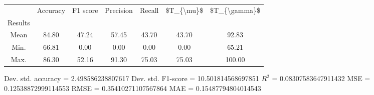 \begin{tabular}{|c|c|c|c|c|c|c|}
\toprule
{} &  Accuracy &  F1 score &  Precision &  Recall &  \$T\_\{\textbackslash mu\}\$ &  \$T\_\{\textbackslash gamma\}\$ \\
Results &           &           &            &         &            &               \\
\hline
Mean    &     84.80 &     47.24 &      57.45 &   43.70 &      43.70 &         92.83 \\
Min.    &     66.81 &      0.00 &       0.00 &    0.00 &       0.00 &         65.21 \\
Max.    &     86.30 &     52.16 &      91.30 &   75.03 &      75.03 &        100.00 \\
\bottomrule
\end{tabular}

 Dev. std. accuracy = 2.498586238807617
 Dev. std. F1-score = 10.501814568697851
 $R^2$ = 0.08307583647911432
 MSE = 0.12538872999114553
 RMSE = 0.35410271107567864
 MAE = 0.15487794804014543